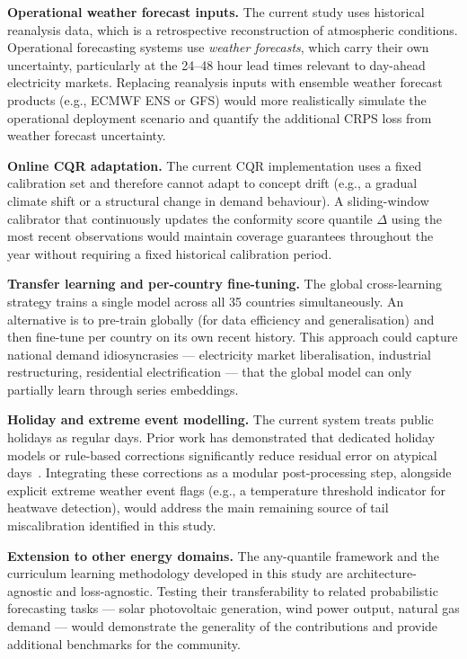 \vspace{0.3cm}

\noindent
\textbf{Operational weather forecast inputs.}
The current study uses historical reanalysis data, which is a
retrospective reconstruction of atmospheric conditions. Operational
forecasting systems use \emph{weather forecasts}, which carry their
own uncertainty, particularly at the 24--48 hour lead times relevant
to day-ahead electricity markets. Replacing reanalysis inputs with
ensemble weather forecast products (e.g., ECMWF ENS or GFS) would
more realistically simulate the operational deployment scenario and
quantify the additional CRPS loss from weather forecast uncertainty.

\vspace{0.3cm}

\noindent
\textbf{Online CQR adaptation.}
The current CQR implementation uses a fixed calibration set and
therefore cannot adapt to concept drift (e.g., a gradual climate
shift or a structural change in demand behaviour). A sliding-window
calibrator that continuously updates the conformity score quantile
$\Delta$ using the most recent observations would maintain coverage
guarantees throughout the year without requiring a fixed historical
calibration period.

\vspace{0.3cm}

\noindent
\textbf{Transfer learning and per-country fine-tuning.}
The global cross-learning strategy trains a single model across all
35 countries simultaneously. An alternative is to pre-train globally
(for data efficiency and generalisation) and then fine-tune per country
on its own recent history. This approach could capture national demand
idiosyncrasies --- electricity market liberalisation, industrial
restructuring, residential electrification --- that the global model
can only partially learn through series embeddings.

\vspace{0.3cm}

\noindent
\textbf{Holiday and extreme event modelling.}
The current system treats public holidays as regular days. Prior work
has demonstrated that dedicated holiday models or rule-based
corrections significantly reduce residual error on atypical
days~\cite{son2022holiday, gunawan2021holiday, arora2018holiday}.
Integrating these corrections as a modular post-processing step,
alongside explicit extreme weather event flags (e.g., a temperature
threshold indicator for heatwave detection), would address the main
remaining source of tail miscalibration identified in this study.

\vspace{0.3cm}

\noindent
\textbf{Extension to other energy domains.}
The any-quantile framework and the curriculum learning methodology
developed in this study are architecture-agnostic and loss-agnostic.
Testing their transferability to related probabilistic forecasting
tasks --- solar photovoltaic generation, wind power output, natural
gas demand --- would demonstrate the generality of the contributions
and provide additional benchmarks for the community.
